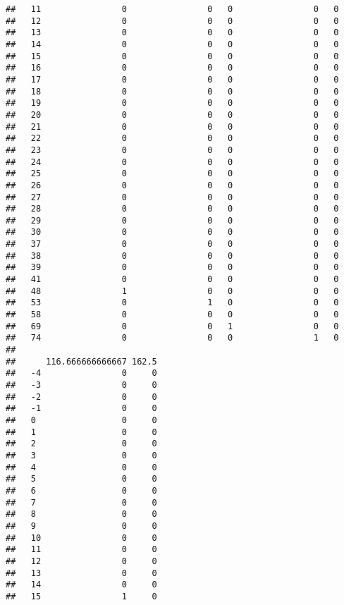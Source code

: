 \documentclass[]{article}
\begin{document}
\begin{verbatim}
##   11                0                0   0                0   0
##   12                0                0   0                0   0
##   13                0                0   0                0   0
##   14                0                0   0                0   0
##   15                0                0   0                0   0
##   16                0                0   0                0   0
##   17                0                0   0                0   0
##   18                0                0   0                0   0
##   19                0                0   0                0   0
##   20                0                0   0                0   0
##   21                0                0   0                0   0
##   22                0                0   0                0   0
##   23                0                0   0                0   0
##   24                0                0   0                0   0
##   25                0                0   0                0   0
##   26                0                0   0                0   0
##   27                0                0   0                0   0
##   28                0                0   0                0   0
##   29                0                0   0                0   0
##   30                0                0   0                0   0
##   37                0                0   0                0   0
##   38                0                0   0                0   0
##   39                0                0   0                0   0
##   41                0                0   0                0   0
##   48                1                0   0                0   0
##   53                0                1   0                0   0
##   58                0                0   0                0   0
##   69                0                0   1                0   0
##   74                0                0   0                1   0
##     
##      116.666666666667 162.5
##   -4                0     0
##   -3                0     0
##   -2                0     0
##   -1                0     0
##   0                 0     0
##   1                 0     0
##   2                 0     0
##   3                 0     0
##   4                 0     0
##   5                 0     0
##   6                 0     0
##   7                 0     0
##   8                 0     0
##   9                 0     0
##   10                0     0
##   11                0     0
##   12                0     0
##   13                0     0
##   14                0     0
##   15                1     0

\end{verbatim}
\end{document}
